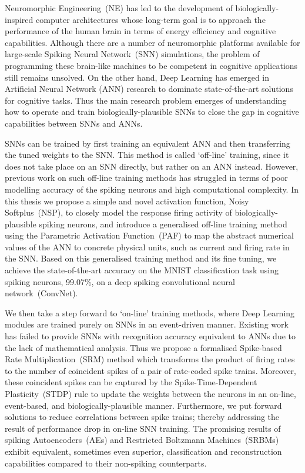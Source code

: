 Neuromorphic Engineering~(NE) has led to the development of biologically-inspired computer architectures whose long-term goal is to approach the performance of the human brain in terms of energy efficiency and cognitive capabilities.
Although there are a number of neuromorphic platforms available for large-scale Spiking Neural Network~(SNN) simulations, the problem of programming these brain-like machines to be competent in cognitive applications still remains unsolved.
On the other hand, Deep Learning has emerged in Artificial Neural Network (ANN) research to dominate state-of-the-art solutions for cognitive tasks.
Thus the main research problem emerges of understanding how to operate and train biologically-plausible SNNs to close the gap in cognitive capabilities between SNNs and ANNs.

SNNs can be trained by first training an equivalent ANN and then transferring the tuned weights to the SNN.
This method is called `off-line' training, since it does not take place on an SNN directly, but rather on an ANN instead.
However, previous work on such off-line training methods has struggled in terms of poor modelling accuracy of the spiking neurons and high computational complexity.
In this thesis we propose a simple and novel activation function, Noisy Softplus~(NSP), to closely model the response firing activity of biologically-plausible spiking neurons,
and introduce a generalised off-line training method using the Parametric Activation Function~(PAF) to map the abstract numerical values of the ANN to concrete physical units, such as current and firing rate in the SNN.
Based on this generalised training method and its fine tuning, we achieve the state-of-the-art accuracy on the MNIST classification task using spiking neurons, 99.07\%, on a deep spiking convolutional neural network~(ConvNet).


We then take a step forward to `on-line' training methods, where Deep Learning modules are trained purely on SNNs in an event-driven manner.
Existing work has failed to provide SNNs with recognition accuracy equivalent to ANNs due to the lack of mathematical analysis. 
Thus we propose a formalised Spike-based Rate Multiplication~(SRM) method which transforms the product of firing rates to the number of coincident spikes of a pair of rate-coded spike trains.
Moreover, these coincident spikes can be captured by the Spike-Time-Dependent Plasticity~(STDP) rule to update the weights between the neurons in an on-line, event-based, and biologically-plausible manner.
Furthermore, we put forward solutions to reduce correlations between spike trains; thereby addressing the result of performance drop in on-line SNN training. 
The promising results of spiking Autoencoders~(AEs) and Restricted Boltzmann Machines~(SRBMs) exhibit equivalent, sometimes even superior, classification and reconstruction capabilities compared to their non-spiking counterparts.

